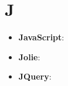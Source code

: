 \section{J}

\begin{itemize} 
	\item
	\textbf{JavaScript}: 
	\item
	\textbf{Jolie}:
	\item
	\textbf{JQuery}: 
\end{itemize}